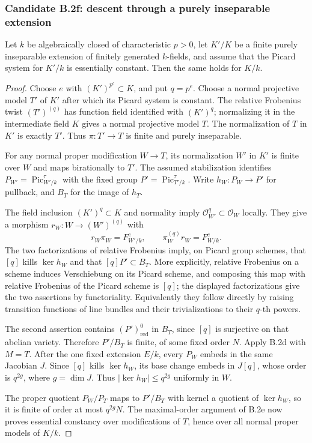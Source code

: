 \subsubsection*{Candidate B.2f: descent through a purely inseparable extension}
Let $k$ be algebraically closed of characteristic $p>0$, let $K'/K$
be a finite purely inseparable extension of finitely generated
$k$-fields, and assume that the Picard system for $K'/k$ is
essentially constant.  Then the same holds for $K/k$.
\begin{proof}
Choose $e$ with $(K')^{p^e}\subset K$, and put $q=p^e$.
Choose a normal projective model $T'$ of $K'$ after which its
Picard system is constant.  The relative Frobenius twist
$(T')^{(q)}$ has function field identified with $(K')^q$;
normalizing it in the intermediate field $K$ gives a normal
projective model $T$.  The normalization of $T$ in $K'$ is
exactly $T'$.  Thus $\pi:T'\to T$ is finite and purely inseparable.

For any normal proper modification $W\to T$, its normalization
$W'$ in $K'$ is finite over $W$ and maps birationally to $T'$.
The assumed stabilization identifies
$P_{W'}=\operatorname{Pic}^{\tau}_{W'/k}$ with the fixed group
$P'=\operatorname{Pic}^{\tau}_{T'/k}$.  Write
$h_W:P_W\to P'$ for pullback, and $B_T$ for the image of $h_T$.

The field inclusion $(K')^q\subset K$ and normality imply
$\mathcal O_{W'}^q\subset\mathcal O_W$ locally.  They give a
morphism $r_W:W\to(W')^{(q)}$ with
\[
 r_W\pi_W=F^e_{W'/k},\qquad
 \pi_W^{(q)}r_W=F^e_{W/k}.
\]
The two factorizations of relative Frobenius imply, on Picard
group schemes, that $[q]$ kills $\ker h_W$ and that
$[q]P'\subset B_T$.  More explicitly, relative Frobenius on a
scheme induces Verschiebung on its Picard scheme, and composing
this map with relative Frobenius of the Picard scheme is $[q]$;
the displayed factorizations give the two assertions by
functoriality.  Equivalently they follow directly by raising
transition functions of line bundles and their trivializations
to their $q$-th powers.

The second assertion contains $(P')_{\mathrm{red}}^0$ in $B_T$,
since $[q]$ is surjective on that abelian variety.  Therefore
$P'/B_T$ is finite, of some fixed order $N$.
Apply B.2d with $M=T$.  After the one fixed extension $E/k$,
every $P_W$ embeds in the same Jacobian $J$.  Since $[q]$
kills $\ker h_W$, its base change embeds in $J[q]$, whose
order is $q^{2g}$, where $g=\dim J$.  Thus
$|\ker h_W|\le q^{2g}$ uniformly in $W$.

The proper quotient $P_W/P_T$ maps to $P'/B_T$ with kernel a
quotient of $\ker h_W$, so it is finite of order at most
$q^{2g}N$.  The maximal-order argument of B.2e now proves
essential constancy over modifications of $T$, hence over all
normal proper models of $K/k$.
\end{proof}

